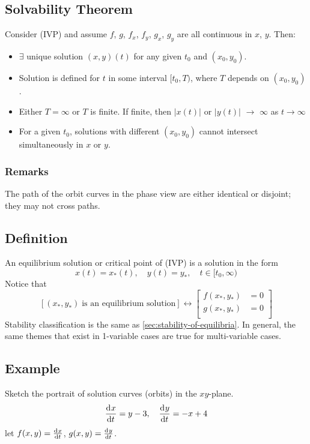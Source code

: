 \documentclass[12pt,twoside]{article}
\begin{document}
\subsection{Solvability Theorem}
Consider (IVP) and assume $f$, $g$, $f_x$, $f_y$, $g_x$, $g_y$ are all
continuous in $x$, $y$. Then:
\begin{itemize}
\item $\exists$ unique solution $(x,y)(t)$ for any given $t_0$ and $(x_0,y_0)$.
\item Solution is defined for $t$ in some interval $[t_0,T)$, where $T$ depends
  on $(x_0, y_0)$.
\item Either $T=\infty$ or $T$ is finite. If finite, then $|x(t)|$ or $|y(t)|$
  $\longrightarrow$ $\infty$ as $t\rightarrow\infty$
\item For a given $t_0$, solutions with different $(x_0,y_0)$ cannot intersect
  simultaneously in $x$ or $y$.
\end{itemize}

\subsubsection*{Remarks}
The path of the orbit curves in the phase view are either identical or disjoint;
they may not cross paths.

\subsection{Definition}
An equilibrium solution or critical point of (IVP) is a solution in the form
$$x(t)=x_*(t),\quad y(t)=y_*,\quad t\in[t_0,\infty)$$
Notice that
\begin{equation*}
  \left[(x_*,y_*)\;\text{is an equilibrium solution}\right] \longleftrightarrow
  \left[
    \begin{aligned}
      f(x_*,y_*)&=0 \\
      g(x_*,y_*)&=0 \\
    \end{aligned}
 \right]
\end{equation*}
Stability classification is the same as \cref{sec:stability-of-equilibria}. In
general, the same themes that exist in 1-variable cases are true for
multi-variable cases.

\subsection{Example}
Sketch the portrait of solution curves (orbits) in the $xy$-plane.
\begin{equation*}
  \frac{\mathrm{d}^{} {x}}{\mathrm{d}{t}^{}} = y-3, \quad \frac{\mathrm{d}^{} {y}}{\mathrm{d}{t}^{}}=-x+4
\end{equation*}
let $f(x,y)=\frac{\mathrm{d}^{} {x}}{\mathrm{d}{t}^{}}$, $g(x,y)=\frac{\mathrm{d}^{} {y}}{\mathrm{d}{t}^{}}$.
\end{document}
